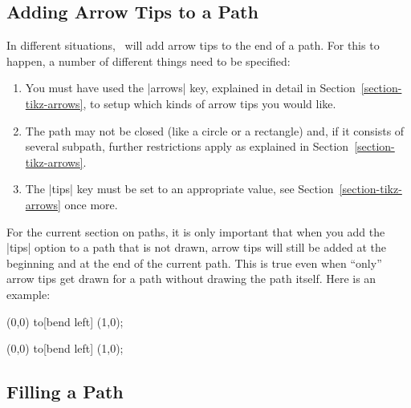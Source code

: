 \subsection{Adding Arrow Tips to a Path}
\label{section-arrow-tip-action}

In different situations, \tikzname\ will add arrow tips to the end of a path.
For this to happen, a number of different things need to be specified:
%
\begin{enumerate}
    \item You must have used the |arrows| key, explained in detail in
        Section~\ref{section-tikz-arrows}, to setup which kinds of arrow tips
        you would like.
    \item The path may not be closed (like a circle or a rectangle) and, if
        it consists of several subpath, further restrictions apply as
        explained in Section~\ref{section-tikz-arrows}.
    \item The |tips| key must be set to an appropriate value, see
        Section~\ref{section-tikz-arrows} once more.
\end{enumerate}

For the current section on paths, it is only important that when you add the
|tips| option to a path that is not drawn, arrow tips will still be added at
the beginning and at the end of the current path. This is true even when
``only'' arrow tips get drawn for a path without drawing the path itself. Here
is an example:
%
\begin{codeexample}[width=2cm,preamble={\usetikzlibrary{arrows.meta,bending}}]
\tikz {} (0,0) to[bend left] (1,0);
\end{codeexample}
%
\begin{codeexample}[width=2cm,preamble={\usetikzlibrary{arrows.meta,bending}}]
\tikz {} (0,0) to[bend left] (1,0);
\end{codeexample}


\subsection{Filling a Path}
\label{section-rules}

